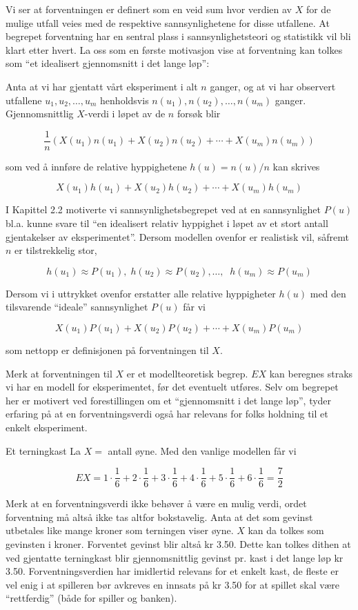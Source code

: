 \noindent Vi ser at forventningen er definert som en veid sum hvor verdien
av $X$ for de mulige utfall veies med de respektive
sannsynlighetene for disse utfallene. At begrepet forventning har
en sentral plass i sannsynlighetsteori og statistikk vil bli
klart etter hvert. La oss som en første motivasjon vise at
forventning kan tolkes som ``et idealisert gjennomsnitt i det
lange løp'':

Anta at vi har gjentatt vårt eksperiment i alt $n$ ganger, og at vi har 
observert utfallene $u_1, u_2, \ldots , u_m$ henholdsvis
$n(u_1), n(u_2), \ldots ,n(u_m)$ ganger. Gjennomsnittlig $X$-verdi i
løpet av de $n$ forsøk blir

\[ \frac{1}{n}(X(u_1)n(u_1)+X(u_2)n(u_2)+\cdots+X(u_m)n(u_m)) \]

\noindent som ved å innføre de relative hyppighetene $h(u)=n(u)/n$ kan
skrives

\[    X(u_1)h(u_1)+X(u_2)h(u_2)+\cdots +X(u_m)h(u_m) \]

\noindent I Kapittel 2.2 motiverte vi sannsynlighetsbegrepet ved at en
sannsynlighet $P(u)$ bl.a. kunne svare til ``en idealisert
relativ hyppighet i løpet av et stort antall gjentakelser av
eksperimentet''. Dersom modellen ovenfor er realistisk vil,
såfremt $n$ er tilstrekkelig stor,

\[ h(u_1)\approx P(u_1),\; h(u_2)\approx P(u_2), \ldots , \;\; h(u_m)\approx P(u_m) \]

\noindent Dersom vi i uttrykket ovenfor  erstatter alle relative
hyppigheter $h(u)$ med den tilsvarende ``ideale'' sannsynlighet
$P(u)$ får vi

\[      X(u_1)P(u_1)+X(u_2)P(u_2)+\cdots +X(u_m)P(u_m) \]

\noindent som nettopp er definisjonen på forventningen til $X$.

Merk at forventningen til $X$ er et modellteoretisk begrep. $EX$
kan beregnes straks vi har en modell for eksperimentet, før det
eventuelt utføres. Selv om begrepet her er motivert ved
forestillingen om et ``gjennomsnitt i det lange løp'', tyder
erfaring på at en forventningsverdi også har relevans for folks
holdning til et enkelt eksperiment.\\ 

\begin{eksempel}{Et terningkast}
La $X=$ antall øyne. Med den vanlige modellen får vi

\[ EX=1 \cdot \frac{1}{6}+2 \cdot \frac{1}{6}+3 \cdot \frac{1}{6}+
  4 \cdot \frac{1}{6}+5 \cdot \frac{1}{6}+6 \cdot \frac{1}{6}=\frac{7}{2} \]

\noindent Merk at en forventningsverdi ikke behøver å være en mulig verdi,
ordet forventning må altså ikke tas altfor bokstavelig. Anta at
det som gevinst utbetales like mange kroner som terningen viser
øyne. $X$ kan da tolkes som gevinsten i kroner. Forventet gevinst
blir altså kr 3.50. Dette kan tolkes dithen at ved gjentatte
terningkast blir gjennomsnittlig gevinst pr. kast i det lange løp
kr 3.50. Forventningsverdien har imidlertid relevans for et
enkelt kast, de fleste er vel enig i at spilleren bør avkreves en
innsats på kr 3.50 for at spillet skal være ``rettferdig'' (både
for spiller og banken).
\end{eksempel}

